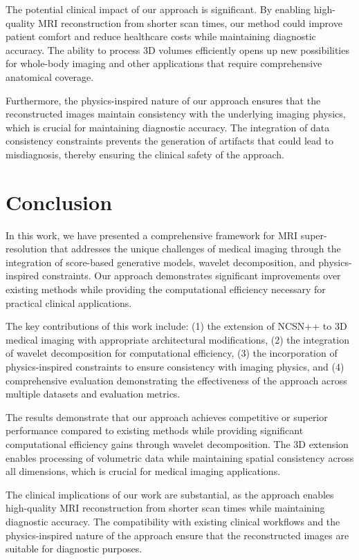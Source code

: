 \documentclass{midl} %
\begin{document}
The potential clinical impact of our approach is significant. By enabling high-quality MRI reconstruction from shorter scan times, our method could improve patient comfort and reduce healthcare costs while maintaining diagnostic accuracy. The ability to process 3D volumes efficiently opens up new possibilities for whole-body imaging and other applications that require comprehensive anatomical coverage.

Furthermore, the physics-inspired nature of our approach ensures that the reconstructed images maintain consistency with the underlying imaging physics, which is crucial for maintaining diagnostic accuracy. The integration of data consistency constraints prevents the generation of artifacts that could lead to misdiagnosis, thereby ensuring the clinical safety of the approach.

\section{Conclusion}

In this work, we have presented a comprehensive framework for MRI super-resolution that addresses the unique challenges of medical imaging through the integration of score-based generative models, wavelet decomposition, and physics-inspired constraints. Our approach demonstrates significant improvements over existing methods while providing the computational efficiency necessary for practical clinical applications.

The key contributions of this work include: (1) the extension of NCSN++ to 3D medical imaging with appropriate architectural modifications, (2) the integration of wavelet decomposition for computational efficiency, (3) the incorporation of physics-inspired constraints to ensure consistency with imaging physics, and (4) comprehensive evaluation demonstrating the effectiveness of the approach across multiple datasets and evaluation metrics.

The results demonstrate that our approach achieves competitive or superior performance compared to existing methods while providing significant computational efficiency gains through wavelet decomposition. The 3D extension enables processing of volumetric data while maintaining spatial consistency across all dimensions, which is crucial for medical imaging applications.

The clinical implications of our work are substantial, as the approach enables high-quality MRI reconstruction from shorter scan times while maintaining diagnostic accuracy. The compatibility with existing clinical workflows and the physics-inspired nature of the approach ensure that the reconstructed images are suitable for diagnostic purposes.
\end{document}
